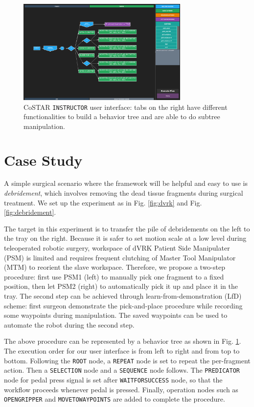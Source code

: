 \documentclass[letterpaper, 10 pt, conference]{ieeeconf}
\begin{document}
\begin{figure}[bt]
\centering
\includegraphics[width=240pt]{instructor.png}
\caption{CoSTAR \texttt{INSTRUCTOR} user interface: tabs on the right have different functionalities to build a behavior tree and are able to do subtree manipulation. }
\label{fig:instructor}
\end{figure}


\section{Case Study}
A simple surgical scenario where the framework will be helpful and easy to use is \textit{debridement}, which involves removing the dead tissue fragments during surgical treatment. We set up the experiment as in Fig. \ref{fig:dvrk} and Fig. \ref{fig:debridement}. 

The target in this experiment is to transfer the pile of debridements  on the left to the tray on the right. Because it is safer to set motion scale at a low level during teleoperated robotic surgery, workspace of dVRK Patient Side Manipulater (PSM) is limited and requires frequent clutching of Master Tool Manipulator (MTM) to reorient the slave workspace. Therefore, we propose a two-step procedure: first use PSM1 (left) to manually pick one fragment to a fixed position, then let PSM2 (right) to automatically pick it up and place it in the tray. The second step can be achieved through learn-from-demonstration (LfD) scheme: first surgeon demonstrate the pick-and-place procedure while recording some waypoints during manipulation. The saved waypoints can be used to automate the robot during the second step. 

The above procedure can be represented by a behavior tree as shown in Fig. \ref{fig:instructor}. The execution order for our user interface is from left to right and from top to bottom. Following the \texttt{ROOT} node, a \texttt{REPEAT} node is set to repeat the per-fragment action. Then a \texttt{SELECTION} node and a \texttt{SEQUENCE} node follows. The \texttt{PREDICATOR} node for pedal press signal is set after \texttt{WAITFORSUCCESS} node, so that the workflow proceeds whenever pedal is pressed. Finally, operation nodes such as \texttt{OPENGRIPPER} and \texttt{MOVETOWAYPOINTS} are added to complete the procedure. 
\end{document}
